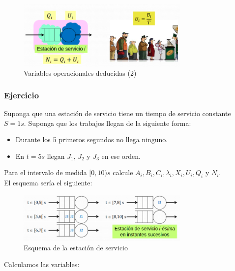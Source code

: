 \documentclass[12pt,spanish]{article}
\begin{document}
\begin{figure}[H]
	\centering
	\includegraphics[width=0.75\textwidth]{vardeduc2.png}
	\caption{Variables operacionales deducidas (2)}
\end{figure}

\subsubsection{Ejercicio}

Suponga que una estación de servicio tiene un tiempo de servicio constante $S=1s$. Suponga que los trabajos llegan de la siguiente forma:
\begin{itemize}
	\item Durante los 5 primeros segundos no llega ninguno.
	\item En $t=5s$ llegan $J_1$, $J_2$ y $J_3$ en ese orden.
\end{itemize}
Para el intervalo de medida $[0,10)s$ calcule $A_i, B_i, C_i, \lambda_i, X_i, U_i, Q_i$ y $N_i$.\\

El esquema sería el siguiente:

\begin{figure}[H]
	\centering
	\includegraphics[width=0.75\textwidth]{ej2.png}
	\caption{Esquema de la estación de servicio}
\end{figure}

Calculamos las variables:
\end{document}
